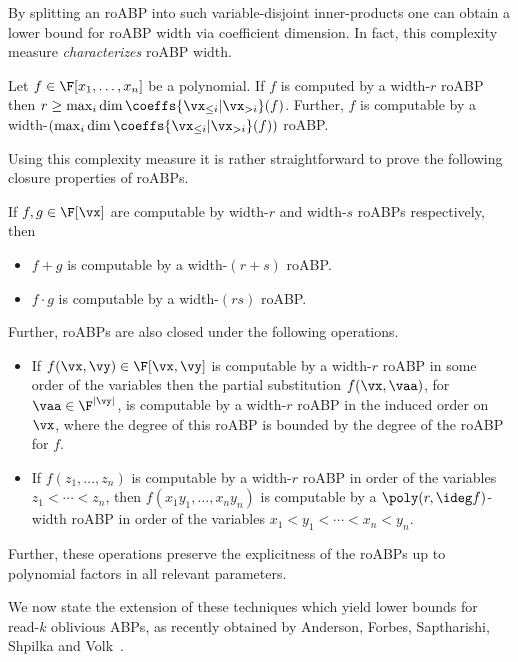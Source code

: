 \documentclass{toc}
\begin{document}
By splitting an roABP into such variable-disjoint inner-products one can obtain a lower bound for roABP width via coefficient dimension.  In fact, this complexity measure \emph{characterizes} roABP width.

\begin{lemmawp}\label{res:roABP-width_eq_dim-coeffs}
        Let $f\in\F[x_1,\ldots,x_n]$ be a polynomial. If $f$ is computed by a width-$r$ roABP then $r \ge \max_i\dim\coeffs{\vx_{\le i}|\vx_{>i}}(f)$. Further, $f$ is computable by a width-$\left(\max_i\dim\coeffs{\vx_{\le i}|\vx_{>i}}(f)\right)$ roABP.
\end{lemmawp}

Using this complexity measure it is rather straightforward to prove the following closure properties of roABPs.

\begin{fact}\label{fact:roABP:closure}
        If $f,g\in\F[\vx]$ are computable by width-$r$ and width-$s$ roABPs respectively, then
        \begin{itemize}
                \item $f+g$ is computable by a width-$(r+s)$ roABP\@.
                \item $f\cdot g$ is computable by a width-$(rs)$ roABP\@.
        \end{itemize}

        \noindent Further, roABPs are also closed under the following operations.
        \begin{itemize}
                \item If $f(\vx,\vy)\in\F[\vx,\vy]$ is computable by a width-$r$ roABP in some order of the variables then the partial substitution $f(\vx,\vaa)$, for $\vaa\in\F^{|\vy|}$, is computable by a width-$r$ roABP in the induced order on $\vx$, where the degree of this roABP is bounded by the degree of the roABP for $f$.
                \item If $f(z_1,\ldots,z_n)$ is computable by a width-$r$ roABP in order of the variables $z_1<\cdots<z_n$, then $f(x_1y_1,\ldots,x_ny_n)$ is computable by a $\poly(r,\ideg f)$-width roABP in order of the variables $x_1<y_1<\cdots<x_n<y_n$.
        \end{itemize}
        Further, these operations preserve the explicitness of the roABPs up to polynomial factors in all relevant parameters.
\end{fact}
%

We now state the extension of these techniques which yield lower bounds for read-$k$ oblivious ABPs, as recently obtained by Anderson, Forbes, Saptharishi, Shpilka and Volk~\cite{AndersonFSSV16}.
\end{document}
